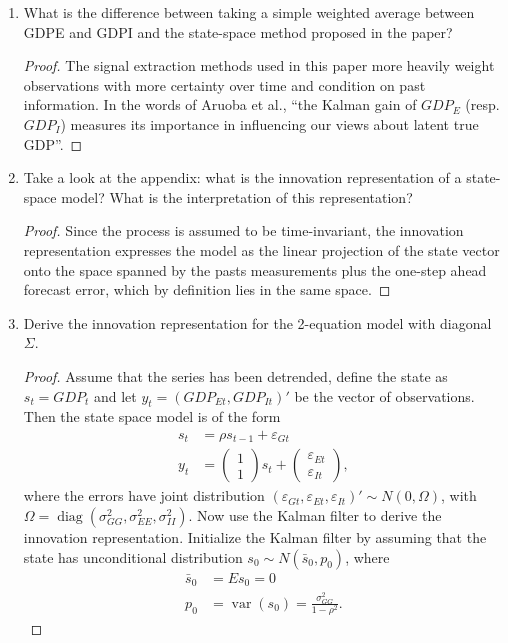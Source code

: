 \documentclass[oneside,reqno]{amsart}
\DeclareMathOperator{\var}{var}
\DeclareMathOperator{\diag}{diag}
\newcommand{\eps}{\varepsilon}
\theoremstyle{definition}
\begin{document}
\begin{enumerate}[label=(\roman*)]
\item
What is the difference between taking a simple weighted average between GDPE and GDPI and the state-space method proposed in the paper?
\begin{proof}
The signal extraction methods used in this paper more heavily weight observations with more certainty over time and condition on past information. In the words of  Aruoba et al., ``the Kalman gain of $GDP_E$ (resp. $GDP_I$) measures its importance in influencing our views about latent true GDP''.
\end{proof}
\item
Take a look at the appendix: what is the innovation representation of a
state-space model? What is the interpretation of this representation?
\begin{proof}
Since the process is assumed to be time-invariant, the innovation representation expresses the model as the linear projection of the state vector onto the space spanned by the pasts measurements plus the one-step ahead forecast error, which by definition lies in the same space.
\end{proof}
\item
Derive the innovation representation for the 2-equation model with diagonal $\Sigma$.
\begin{proof}
Assume that the series has been detrended, define the state as $s_t = GDP_t$ and let $y_t = (GDP_{Et}, GDP_{It})'$ be the vector of observations. Then the state space model is of the form
\begin{align}
	s_t & =  \rho s_{t-1} + \eps_{Gt} \\
	y_t &= \begin{pmatrix}
		1 \\ 1
	\end{pmatrix} s_t
	+ \begin{pmatrix}
		\eps_{Et} \\ \eps_{It}
	\end{pmatrix},
\end{align}
where the errors have joint distribution $(\eps_{Gt}, \eps_{Et}, \eps_{It})' \sim N(0, \Omega)$, with $\Omega = \diag(\sigma_{GG}^2, \sigma_{EE}^2, \sigma_{II}^2)$. Now use the Kalman filter to derive the innovation representation. Initialize the Kalman filter by assuming that the state has unconditional distribution $s_0 \sim N(\bar s_0, p_0)$, where
\begin{align*}
	\bar s_0 &= E s_0 = 0 \\
	p_0 &= \var(s_0) = \frac{\sigma^2_{GG}}{1-\rho^2}.
\end{align*}

\end{proof}
\end{enumerate}
\end{document}
